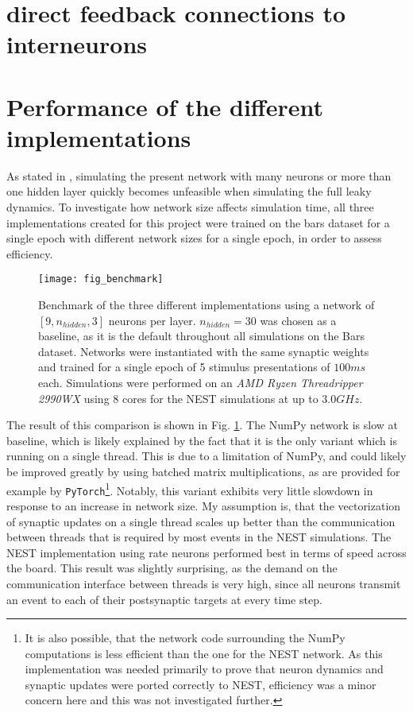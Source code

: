 \section{direct feedback connections to interneurons}\label{sec-electric-syns}

\cite{Vaughn2022,Mancilla2007}



\section{Performance of the different implementations}\label{sec-benchmark}

As stated in \cite{Haider2021}, simulating the present network with many neurons or more than one hidden layer quickly
becomes unfeasible when simulating the full leaky dynamics. To investigate how network size affects simulation time, all
three implementations created for this project were trained on the bars dataset for a single epoch with different
network sizes for a single epoch, in order to assess efficiency.


\begin{figure}[t]
    \centering
    \texttt{[image: fig\_benchmark]}
    \caption{Benchmark of the three different implementations using a network of $[9, n_{hidden}, 3]$ neurons per layer.
        $n_{hidden}=30$ was chosen as a baseline, as it is the default throughout all simulations on the Bars dataset.
        Networks were instantiated with the same synaptic weights and trained for a single epoch of 5 stimulus
        presentations of $100ms$ each. Simulations were performed on an \textit{AMD Ryzen Threadripper 2990WX} using 8
        cores for the NEST simulations at up to $3.0GHz$.}
    \label{fig-benchmark}
\end{figure}

The result of this comparison is shown in Fig. \ref{fig-benchmark}. The NumPy network is slow at baseline, which is
likely explained by the fact that it is the only variant which is running on a single thread. This is due to a
limitation of NumPy, and could likely be improved greatly by using batched matrix multiplications, as are provided for
example by \texttt{PyTorch}\footnote{It is also possible, that the network code surrounding the NumPy computations is
    less efficient than the one for the NEST network. As this implementation was needed primarily to prove that neuron
    dynamics and synaptic updates were ported correctly to NEST, efficiency was a minor concern here and this was not
    investigated further.}.  Notably, this variant exhibits very little slowdown in response to an increase in network size.
My assumption is, that the vectorization of synaptic updates on a single thread scales up better than the communication
between threads that is required by most events in the NEST simulations. The NEST implementation using rate neurons
performed best in terms of speed across the board. This result was slightly surprising, as the demand on the
communication interface between threads is very high, since all neurons transmit an event to each of their postsynaptic
targets at every time step.

